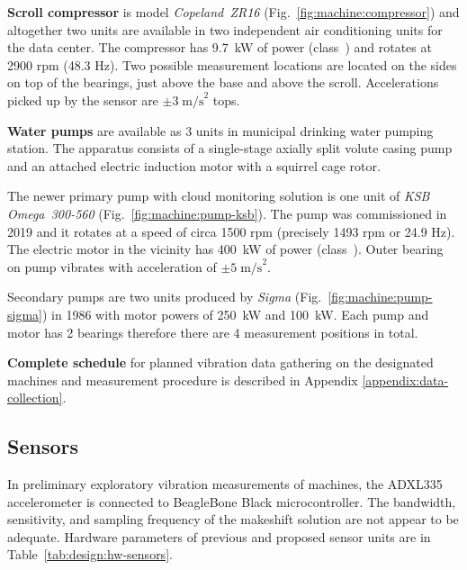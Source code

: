 \textbf{Scroll compressor} is model \emph{Copeland~ZR16} (Fig.~\ref{fig:machine:compressor}) and altogether two units are available in two independent air conditioning units for the data center. The compressor has 9.7~kW of power (class~) and rotates at 2900 rpm (48.3 Hz). Two possible measurement locations are located on the sides on top of the bearings, just above the base and above the scroll. Accelerations picked up by the sensor are $\pm 3\;\mathrm{m/s}^2$ tops.

\textbf{Water pumps} are available as 3 units in municipal drinking water pumping station. The apparatus consists of a single-stage axially split volute casing pump and an attached electric induction motor with a squirrel cage rotor. 

The newer primary pump with cloud monitoring solution is one unit of \emph{KSB Omega~300-560} (Fig.~\ref{fig:machine:pump-ksb}). The pump was commissioned in 2019 and it rotates at a speed of circa 1500 rpm (precisely 1493 rpm or 24.9 Hz). The electric motor in the vicinity has 400~kW of power (class~). Outer bearing on pump vibrates with acceleration of $\pm 5 \;\mathrm{m/s}^2$. 

Secondary pumps are two units produced by \emph{Sigma} (Fig.~\ref{fig:machine:pump-sigma}) in 1986 with motor powers of 250~kW and 100~kW. Each pump and motor has 2 bearings therefore there are 4 measurement positions in total.

\textbf{Complete schedule} for planned vibration data gathering on the designated machines and measurement procedure is described in Appendix \ref{appendix:data-collection}.

\subsection{Sensors}
In preliminary exploratory vibration measurements of machines, the ADXL335 accelerometer is connected to BeagleBone Black microcontroller. The bandwidth, sensitivity, and sampling frequency of the makeshift solution are not appear to be adequate. Hardware parameters of previous and proposed sensor units are in Table~\ref{tab:design:hw-sensors}.

